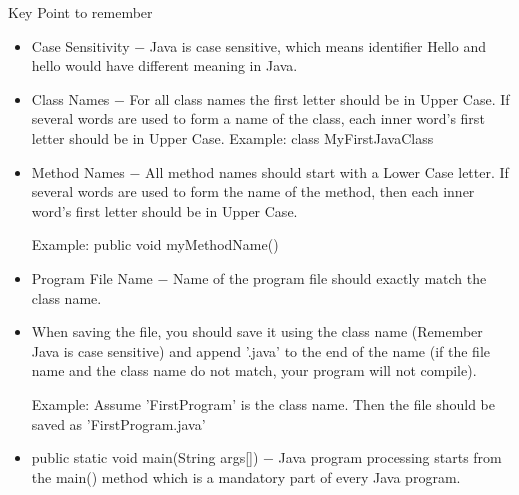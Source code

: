 \documentclass{beamer}
\begin{document}
\begin{frame}{Key Point to remember}
	\begin{itemize}
	\item 	Case Sensitivity − Java is case sensitive, which means identifier Hello and hello would have different meaning in Java.


\item Class Names − For all class names the first letter should be in Upper Case. If several words are used to form a name of the class, each inner word's first letter should be in Upper Case.
		Example: class MyFirstJavaClass


\item Method Names − All method names should start with a Lower Case letter. If several words are used to form the name of the method, then each inner word's first letter should be in Upper Case.

		Example: public void myMethodName()


\item Program File Name − Name of the program file should exactly match the class name.


\item When saving the file, you should save it using the class name (Remember Java is case sensitive) and append '.java' to the end of the name (if the file name and the class name do not match, your program will not compile).

		Example: Assume 'FirstProgram' is the class name. Then the file should be saved as 'FirstProgram.java'


\item public static void main(String args[]) − Java program processing starts from the main() method which is a mandatory part of every Java program.


	\end{itemize}
\end{frame}
\end{document}
